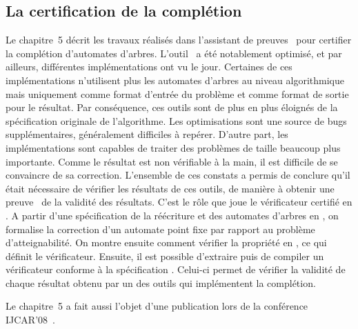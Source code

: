 \subsection*{La certification de la complétion}
Le chapitre~5 décrit les travaux réalisés dans l'assistant de preuves \coq\ pour certifier la
complétion d'automates d'arbres. L'outil \timbuk\ a été notablement optimisé, et par ailleurs, différentes implémentations 
ont vu le jour. Certaines de ces implémentations n'utilisent plus les automates d'arbres au niveau algorithmique mais uniquement
comme format d'entrée du problème et comme format de sortie pour le résultat. %
Par conséquence, ces outils sont de plus en plus éloignés de la spécification originale
de l'algorithme. Les optimisations sont une source de bugs supplémentaires, généralement difficiles à repérer.
D'autre part, les implémentations %
sont capables de traiter des problèmes de taille beaucoup plus importante. Comme le résultat est non vérifiable à la main,
il est difficile de se convaincre de sa correction. L'ensemble de ces constats a permis de conclure qu'il était nécessaire de
vérifier les résultats de ces outils, de manière à obtenir une preuve \coq\ de la validité des résultats. C'est le rôle que joue
le vérificateur certifié en \coq. A partir d'une spécification de la réécriture et des automates d'arbres en \coq, on formalise
la correction d'un automate point fixe par rapport au problème d'atteignabilité. On montre ensuite comment vérifier la propriété
en \coq, ce qui définit le vérificateur. Ensuite, il est possible d'extraire puis de compiler un vérificateur 
conforme à la spécification \coq. Celui-ci permet de vérifier la validité de chaque résultat obtenu par un des outils
qui implémentent la complétion.

Le chapitre~5 a fait aussi l'objet d'une publication lors de la conférence IJCAR'08~\cite{BoyerGJ-IJCAR08}.

